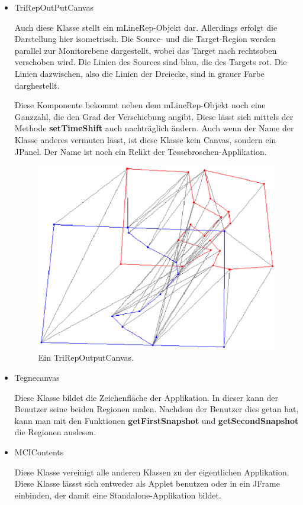 \begin{itemize}
\item TriRepOutPutCanvas

Auch diese Klasse stellt ein mLineRep-Objekt dar. Allerdings erfolgt die Darstellung hier isometrisch. Die Source- und die Target-Region werden parallel zur Monitorebene dargestellt, wobei das Target nach rechtsoben verschoben wird. Die Linien des Sources sind blau, die des Targets rot. Die Linien dazwischen, also die Linien der Dreiecke, sind in grauer Farbe darghestellt.

Diese Komponente bekommt neben dem mLineRep-Objekt noch eine Ganzzahl, die den Grad der Verschiebung angibt. Diese lässt sich mittels der Methode \textbf{setTimeShift} auch nachträglich ändern. Auch wenn der Name der Klasse anderes vermuten lässt, ist diese Klasse kein Canvas, sondern ein JPanel. Der Name ist noch ein Relikt der T\o{}ssebroschen-Applikation.

\begin{figure}
	\centering
	\includegraphics[scale=0.7]{TriRepOutPutCanvas.eps}
	\caption{Ein TriRepOutputCanvas.}
	\label{fig:TriRepOutputCanvas}
\end{figure}




\item Tegnecanvas

Diese Klasse bildet die Zeichenfläche der Applikation. In dieser kann der Benutzer seine beiden Regionen malen. Nachdem der Benutzer dies getan hat, kann man mit den Funktionen \textbf{getFirstSnapshot} und \textbf{getSecondSnapshot} die Regionen auslesen. 

\item MCIContents

Diese Klasse vereinigt alle anderen Klassen zu der eigentlichen Applikation. Diese Klasse lässst sich entweder als Applet benutzen oder in ein JFrame einbinden, der damit eine Standalone-Applikation bildet.
\end{itemize}
